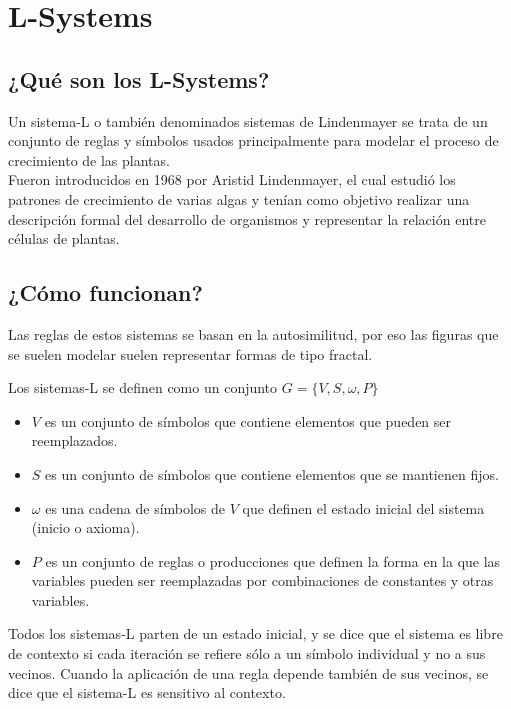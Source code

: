 \chapter{L-Systems}

\section{¿Qué son los L-Systems?}

\noindent Un sistema-L o también denominados sistemas de Lindenmayer se trata de un conjunto de reglas y símbolos usados principalmente para modelar el proceso de crecimiento de las plantas. \cite{eswiki:l-systems}\\

\noindent Fueron introducidos en 1968 por Aristid Lindenmayer, el cual estudió los patrones de crecimiento de varias algas y tenían como objetivo realizar una descripción formal del desarrollo de organismos y representar la relación entre células de plantas. \cite{eswiki:l-systems}

\section{¿Cómo funcionan?}

\noindent Las reglas de estos sistemas se basan en la autosimilitud, por eso las figuras que se suelen modelar suelen representar formas de tipo fractal. \cite{eswiki:l-systems}

\noindent Los sistemas-L se definen como un conjunto $G=\{V,S, \omega ,P\}$ \cite{eswiki:l-systems}

\begin{itemize}
    \item $V$ es un conjunto de símbolos que contiene elementos que pueden ser reemplazados.
    \item $S$ es un conjunto de símbolos que contiene elementos que se mantienen fijos.
    \item $\omega$ es una cadena de símbolos de $V$ que definen el estado inicial del sistema (inicio o axioma).
    \item $P$ es un conjunto de reglas o producciones que definen la forma en la que las variables pueden ser reemplazadas por combinaciones de constantes y otras variables.
\end{itemize}

\noindent Todos los sistemas-L parten de un estado inicial, y se dice que el sistema es libre de contexto si cada iteración se refiere sólo a un símbolo individual y no a sus vecinos. Cuando la aplicación de una regla depende también de sus vecinos, se dice que el sistema-L es sensitivo al contexto. \cite{eswiki:l-systems}

